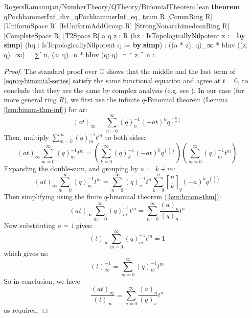 \documentclass[12pt]{amsart}
\theoremstyle{definition}
\theoremstyle{remark}
\numberwithin{equation}{subsection}
\newcommand{\qbin}[2]{\genfrac{[}{]}{0pt}{}{#1}{#2}_{q}}
\newcommand{\kw}[1]{\textcolor{keywordcolor}{\textbf{#1}}}
\newcommand{\var}[1]{\textcolor{tacticcolor}{#1}}
\newcommand{\imp}[1]{\textcolor{commentcolor}{\textbraceleft#1\textbraceright}}
\begin{document}
\begin{code}{RogersRamanujan/NumberTheory/QTheory/BinomialTheorem.lean}
\kw{theorem} qPochhammerInf_div_qPochhammerInf_eq_tsum \imp{R} [CommRing \var{R}] [UniformSpace \var{R}]
  [IsUniformAddGroup \var{R}] [StrongNonarchimedeanRing \var{R}] [CompleteSpace \var{R}] [T2Space \var{R}]
  \imp{a q z : R} (\var{hz} : IsTopologicallyNilpotent \var{z} := \kw{by} \kw{simp})
  (\var{hq} : IsTopologicallyNilpotent \var{q} := \kw{by} \kw{simp}) :
  ((\var{a} * \var{z}); \var{q})_∞ * bInv ((\var{z}; \var{q})_∞) = ∑' \var{n}, (\var{a}; \var{q})_\var{n} * bInv (\var{q}; \var{q})_\var{n} * \var{z} ^ \var{n} :=
\end{code}
\begin{proof}
    The standard proof over $\mathbb{C}$ shows that the middle and the last term of \eqref{eqn:q-binomial-series} satisfy the same functional equation and agree at $t = 0$, to conclude that they are the same by complex analysis (e.g. see \cite[p. 10]{Andrews1986}).
    In our case (for more general ring $R$), we first use the infinite $q$-Binomial theorem (Lemma \ref{lem:binom-thm-inf}) for $at$:
    \begin{equation}
        (at)_\infty = \sum_{n=0}^\infty (q)_n^{-1} (-at)^n q^{\binom{n}{2}}
    \end{equation}
    Then, multiply $\sum_{m=0}^{\infty} (q)_m^{-1} t^m$ to both sides:
    \begin{equation}
        (at)_\infty \sum_{m=0}^{\infty} (q)_m^{-1} t^m = \left( \sum_{k=0}^\infty (q)_k^{-1} (-at)^k q^{\binom{k}{2}} \right) \left( \sum_{m=0}^{\infty} (q)_m^{-1} t^m \right)
    \end{equation}
    Expanding the double-sum, and grouping by $n := k+m$:
    \begin{equation}
        (at)_\infty \sum_{m=0}^{\infty} (q)_m^{-1} t^m = \sum_{n=0}^\infty (q)_n^{-1} t^n \sum_{k=0}^n \qbin{n}{k} (-a)^k q^{\binom{k}{2}}
    \end{equation}
    Then simplifying using the finite $q$-binomial theorem (\ref{lem:binom-thm}):
    \begin{equation}
        (at)_\infty \sum_{m=0}^{\infty} (q)_m^{-1} t^m = \sum_{n=0}^\infty \frac{(a)_n}{(q)_n} t^n
    \end{equation}
    Now substituting $a=1$ gives:
    \begin{equation}
        (t)_\infty \sum_{m=0}^{\infty} (q)_m^{-1} t^m = 1
    \end{equation}
    which gives us:
    \begin{equation}
    \label{eqn:poch-inv}
        (t)_\infty^{-1} = \sum_{m=0}^{\infty} (q)_m^{-1} t^m
    \end{equation}
    So in conclusion, we have
    \begin{equation}
        \frac{(at)_\infty}{(t)_\infty} = \sum_{n=0}^\infty \frac{(a)_n}{(q)_n} t^n
    \end{equation}
    as required.
\end{proof}
\end{document}
